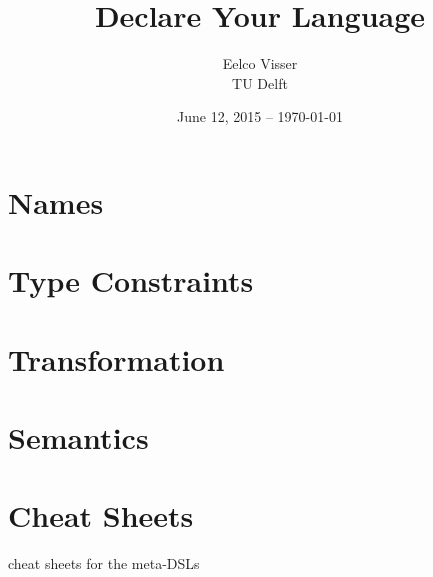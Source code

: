 \title{Declare Your Language}
	
\author{Eelco Visser\\[20pt]TU Delft}
	
\date{June 12, 2015 -- \today}
	


\newpage







\chapter{Names}

\chapter{Type Constraints}

\chapter{Transformation}

\chapter{Semantics}



	
\appendix
\chapter{Cheat Sheets}
cheat sheets for the meta-DSLs

